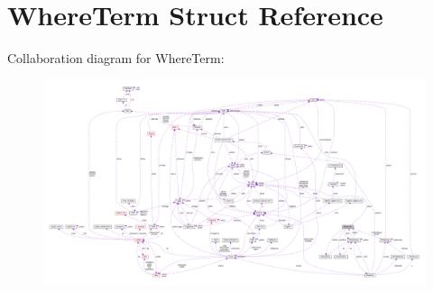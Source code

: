 \hypertarget{structWhereTerm}{}\section{Where\+Term Struct Reference}
\label{structWhereTerm}


Collaboration diagram for Where\+Term\+:\nopagebreak
\begin{figure}[H]
\begin{center}
\leavevmode
\includegraphics[width=350pt]{structWhereTerm__coll__graph}
\end{center}
\end{figure}

